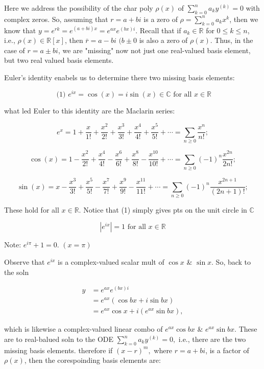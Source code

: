 

Here we address the possibility of the char poly \( \rho(x) \) of \(
\sum_{k=0}^{n} a_ky^{(k)} = 0  \) with complex zeros. So, assuming that
\( r = a + bi \) is a zero of \( \rho = \sum_{k=0}^{n} a_k x^k \), then
we know that \( y= e^{rk} = e^{(a+bi)x} = e^{ax} e^{(bx)i}\). Recall
that if \( a_k \in \mathbb{R} \) for \( 0 \leq k \leq n \), i.e., \(
\rho(x) \in \mathbb{R}[x] \), then \( \bar{r} = a-bi\) \( (b \pm 0 \) is
also a zero of \( \rho(x) \). Thus, in the case of \( r = a \pm bi \),
we are "missing" now not just one real-valued basis element, but two
real valued basis elements. 

Euler's identity enabels us to determine there two missing basis
elements: 

\[ \text{ (1) } e^{ix} = \cos(x) = i\sin(x) \in \mathbb{C} \text{ for all } x \in
\mathbb{R} \]

what led Euler to this identity are the Maclarin series: 

\[ e^x = 1 + \frac{x}{1!} + \frac{x^2}{2!} + \frac{x^3}{3!}+
\frac{x^4}{4!}+ \frac{x^5}{5!} + \cdots = \sum_{n \geq 0} \frac{x^n}{n!};\]

\[ \cos(x) = 1 - \frac{x^2}{2!} +
\frac{x^4}{4!} - \frac{x^6}{6!} + \frac{x^8}{8!} - \frac{x^10}{10!} +
\cdots = \sum_{n \geq 0} (-1)^n \frac{x^{2n}}{2n!};\]

\[ \sin(x) =  x -  \frac{x^3}{3!} + \frac{x^5}{5!} - \frac{x^7}{7!} +
\frac{x^9}{9!} - \frac{x^11}{11!} + \cdots = \sum_{n \geq 0} (-1)^n
\frac{x^{2n +1}}{(2n+1)!};\]

These hold for all \( x \in \mathbb{R} \). Notice that (1) simply gives
pts on the unit circle in \( \mathbb{C} \)

\[ |e^{ix}| = 1 \text{ for all } x \in \mathbb{R} \]

Note: \( e^{i \pi} + 1 = 0. \) \( (x = \pi) \)

Observe that \( e^{ix} \) is a complex-valued scalar mult of \( \cos x
\) \& \( \sin x \). So, back to the soln

\begin{align*}
  y &= e^{ax} e^{(bx)i} \\
  &=e^{ax}(\cos bx + i \sin bx) \\
  &= e^{ax} \cos x + i(e^{ax} \sin bx),
\end{align*}

which is likewise a complex-valued linear combo of \( e^{ax} \cos bx \) \& \(
e^{ax} \sin bx \). These are to real-balued soln to the ODE \(
\sum_{k=0}^{n}a_ky^{(k)} =0, \) i.e., there are the two missing basis
elements. therefore if \( (x-r)^m, \) where \( r = a +bi \), is a factor
of \( \rho(x) \), then the corespoinding basis elements are: 

